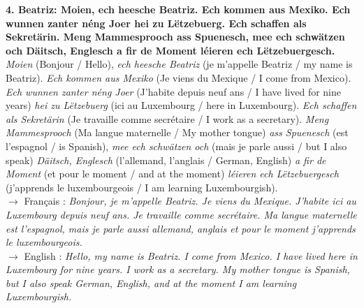 \noindent\textbf{4. Beatriz: Moien, ech heesche Beatriz. Ech kommen aus Mexiko. Ech wunnen zanter néng Joer hei zu Lëtzebuerg. Ech schaffen als Sekretärin. Meng Mammesprooch ass Spuenesch, mee ech schwätzen och Däitsch, Englesch a fir de Moment léieren ech Lëtzebuergesch.}\\
\textit{Moien} (Bonjour / Hello), \textit{ech heesche Beatriz} (je m'appelle Beatriz / my name is Beatriz). \textit{Ech kommen aus Mexiko} (Je viens du Mexique / I come from Mexico). \textit{Ech wunnen zanter néng Joer} (J'habite depuis neuf ans / I have lived for nine years) \textit{hei zu Lëtzebuerg} (ici au Luxembourg / here in Luxembourg). \textit{Ech schaffen als Sekretärin} (Je travaille comme secrétaire / I work as a secretary). \textit{Meng Mammesprooch} (Ma langue maternelle / My mother tongue) \textit{ass Spuenesch} (est l'espagnol / is Spanish), \textit{mee ech schwätzen och} (mais je parle aussi / but I also speak) \textit{Däitsch, Englesch} (l'allemand, l'anglais / German, English) \textit{a fir de Moment} (et pour le moment / and at the moment) \textit{léieren ech Lëtzebuergesch} (j'apprends le luxembourgeois / I am learning Luxembourgish).\\
$\rightarrow$ Français : \textit{Bonjour, je m'appelle Beatriz. Je viens du Mexique. J'habite ici au Luxembourg depuis neuf ans. Je travaille comme secrétaire. Ma langue maternelle est l'espagnol, mais je parle aussi allemand, anglais et pour le moment j'apprends le luxembourgeois.}\\
$\rightarrow$ English : \textit{Hello, my name is Beatriz. I come from Mexico. I have lived here in Luxembourg for nine years. I work as a secretary. My mother tongue is Spanish, but I also speak German, English, and at the moment I am learning Luxembourgish.}\\[0.5em]

